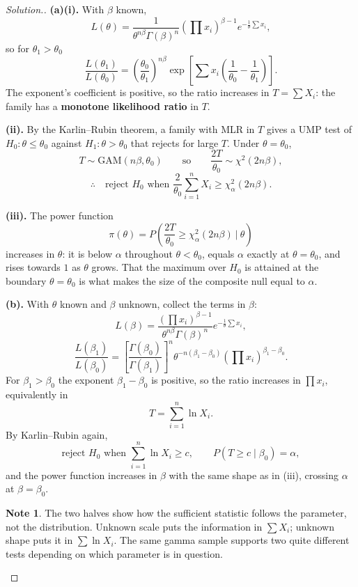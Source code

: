 \documentclass[12pt,a4paper]{report}
\theoremstyle{definition}
\newtheorem{note}[thm]{Note}
\theoremstyle{plain}
\newenvironment{solution}
  {\renewcommand{\qedsymbol}{}\begin{proof}[\textit{Solution}.]}
  {\end{proof}}
\begin{document}
\begin{solution}
\textbf{(a)(i).} With $\beta$ known,
\[L(\theta)=\frac{1}{\theta^{n\beta}\Gamma(\beta)^n}
\left(\prod x_i\right)^{\beta-1}e^{-\frac{1}{\theta}\sum x_i},\]
so for $\theta_1>\theta_0$
\[\frac{L(\theta_1)}{L(\theta_0)}
=\left(\frac{\theta_0}{\theta_1}\right)^{n\beta}
\exp\!\left[\sum x_i\left(\frac{1}{\theta_0}-\frac{1}{\theta_1}\right)\right].\]
The exponent's coefficient is positive, so the ratio increases in
$T=\sum X_i$: the family has a \textbf{monotone likelihood ratio} in $T$.

\textbf{(ii).} By the Karlin--Rubin theorem, a family with MLR in $T$ gives a UMP
test of $H_0:\theta\leq\theta_0$ against $H_1:\theta>\theta_0$ that rejects for
large $T$. Under $\theta=\theta_0$,
\[T\sim\text{GAM}(n\beta,\theta_0)\qquad\text{so}\qquad
\frac{2T}{\theta_0}\sim\chi^2(2n\beta),\]
\[\therefore\quad\text{reject } H_0 \text{ when }
\frac{2}{\theta_0}\sum_{i=1}^nX_i\geq\chi^2_\alpha(2n\beta).\]

\textbf{(iii).} The power function
\[\pi(\theta)=P\!\left(\frac{2T}{\theta_0}\geq\chi^2_\alpha(2n\beta)\ |\
\theta\right)\]
increases in $\theta$: it is below $\alpha$ throughout $\theta<\theta_0$, equals
$\alpha$ exactly at $\theta=\theta_0$, and rises towards $1$ as $\theta$ grows.
That the maximum over $H_0$ is attained at the boundary $\theta=\theta_0$ is what
makes the size of the composite null equal to $\alpha$.

\textbf{(b).} With $\theta$ known and $\beta$ unknown, collect the terms in
$\beta$:
\[L(\beta)=\frac{\left(\prod x_i\right)^{\beta-1}}
{\theta^{n\beta}\Gamma(\beta)^n}e^{-\frac{1}{\theta}\sum x_i},\]
\[\frac{L(\beta_1)}{L(\beta_0)}
=\left[\frac{\Gamma(\beta_0)}{\Gamma(\beta_1)}\right]^n
\theta^{-n(\beta_1-\beta_0)}
\left(\prod x_i\right)^{\beta_1-\beta_0}.\]
For $\beta_1>\beta_0$ the exponent $\beta_1-\beta_0$ is positive, so the ratio
increases in $\prod x_i$, equivalently in
\[T=\sum_{i=1}^n\ln X_i.\]
By Karlin--Rubin again,
\[\text{reject } H_0 \text{ when } \sum_{i=1}^n\ln X_i\geq c,\qquad
P\left(T\geq c\mid\beta_0\right)=\alpha,\]
and the power function increases in $\beta$ with the same shape as in (iii),
crossing $\alpha$ at $\beta=\beta_0$.

\begin{note}
The two halves show how the sufficient statistic follows the parameter, not the
distribution. Unknown scale puts the information in $\sum X_i$; unknown shape puts
it in $\sum\ln X_i$. The same gamma sample supports two quite different tests
depending on which parameter is in question.
\end{note}
\end{solution}
\end{document}
